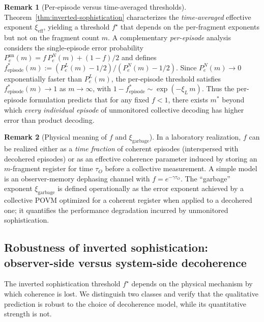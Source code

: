 \documentclass[11pt]{article}
\newcommand{\1}{\mathbf{1}}
\newcommand{\QCBdist}{\xi}
\theoremstyle{definition}
\newtheorem{remark}{Remark}
\theoremstyle{plain}
\begin{document}
\begin{remark}[Per-episode versus time-averaged thresholds]
\label{rem:fstar-two-formulations}
Theorem~\ref{thm:inverted-sophistication} characterizes the \emph{time-averaged} effective exponent $\QCBdist_{\mathrm{eff}}$, yielding a threshold $f^\star$ that depends on the per-fragment exponents but not on the fragment count $m$.
A complementary \emph{per-episode} analysis considers the single-episode error probability $P_e^{\mathrm{un}}(m) = f\,P_e^N(m) + (1{-}f)/2$ and defines
$f^*_{\mathrm{episode}}(m) := (P_e^L(m) - 1/2)/(P_e^N(m) - 1/2)$.
Since $P_e^N(m) \to 0$ exponentially faster than $P_e^L(m)$, the per-episode threshold satisfies $f^*_{\mathrm{episode}}(m) \to 1$ as $m\to\infty$, with $1 - f^*_{\mathrm{episode}} \sim \exp(-\QCBdist_L\,m)$.
Thus the per-episode formulation predicts that for any fixed $f < 1$, there exists $m^*$ beyond which \emph{every individual episode} of unmonitored collective decoding has higher error than product decoding.
\end{remark}

\begin{remark}[Physical meaning of $f$ and $\QCBdist_{\mathrm{garbage}}$]
In a laboratory realization, $f$ can be realized either as a \emph{time fraction} of coherent episodes (interspersed with decohered episodes) or as an effective coherence parameter induced by storing an $m$-fragment register for time $\tau_O$ before a collective measurement.
A simple model is an observer-memory dephasing channel with $f=e^{-\gamma \tau_O}$.
The ``garbage'' exponent $\QCBdist_{\mathrm{garbage}}$ is defined operationally as the error exponent achieved by a collective POVM optimized for a coherent register when applied to a decohered one; it quantifies the performance degradation incurred by unmonitored sophistication.
\end{remark}

\subsection{Robustness of inverted sophistication: observer-side versus system-side decoherence}
\label{sec:robustness}

The inverted sophistication threshold $f^\star$ depends on the physical mechanism by which coherence is lost.  We distinguish two classes and verify that the qualitative prediction is robust to the choice of decoherence model, while its quantitative strength is not.
\end{document}
